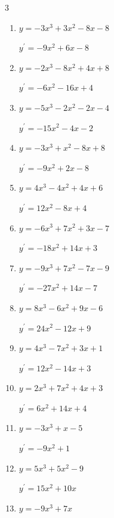 \begin{multicols}{3}
\begin{enumerate}
        $\displaystyle y^{\prime}=6x^{2}-2x+3$

  \item $y=-3x^{3}+3x^{2}-8x-8$

        $\displaystyle y^{\prime}=-9x^{2}+6x-8$

  \item $y=-2x^{3}-8x^{2}+4x+8$

        $\displaystyle y^{\prime}=-6x^{2}-16x+4$

  \item $y=-5x^{3}-2x^{2}-2x-4$

        $\displaystyle y^{\prime}=-15x^{2}-4x-2$

  \item $y=-3x^{3}+x^{2}-8x+8$

        $\displaystyle y^{\prime}=-9x^{2}+2x-8$

  \item $y=4x^{3}-4x^{2}+4x+6$

        $\displaystyle y^{\prime}=12x^{2}-8x+4$

  \item $y=-6x^{3}+7x^{2}+3x-7$

        $\displaystyle y^{\prime}=-18x^{2}+14x+3$

  \item $y=-9x^{3}+7x^{2}-7x-9$

        $\displaystyle y^{\prime}=-27x^{2}+14x-7$

  \item $y=8x^{3}-6x^{2}+9x-6$

        $\displaystyle y^{\prime}=24x^{2}-12x+9$

  \item $y=4x^{3}-7x^{2}+3x+1$

        $\displaystyle y^{\prime}=12x^{2}-14x+3$

  \item $y=2x^{3}+7x^{2}+4x+3$

        $\displaystyle y^{\prime}=6x^{2}+14x+4$

  \item $y=-3x^{3}+x-5$

        $\displaystyle y^{\prime}=-9x^{2}+1$

  \item $y=5x^{3}+5x^{2}-9$

        $\displaystyle y^{\prime}=15x^{2}+10x$

  \item $y=-9x^{3}+7x$


\end{enumerate}
\end{multicols}
